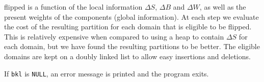 \begin{enumerate}
flipped is a function of the local information
$\Delta S$, $\Delta B$ and $\Delta W$,
as well as the present weights of the components
(global information).
At each step we evaluate the cost of the resulting partition for each
domain that is eligible to be flipped. 
This is relatively expensive when compared to using a heap to contain
$\Delta S$ for each domain, but we have found the resulting
partitions to be better.
The eligible domains are kept on a doubly linked list to allow easy
insertions and deletions.
\par {}
If {\tt bkl} is {\tt NULL},
an error message is printed and the program exits.
\end{enumerate}
